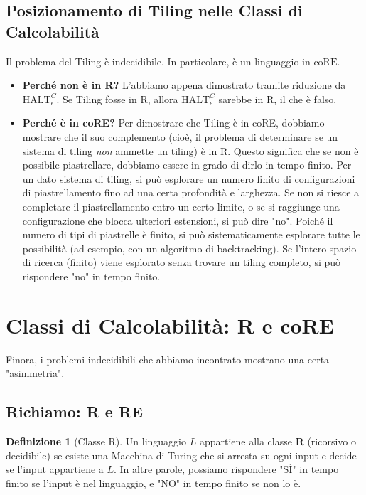 \documentclass[a4paper]{article}
\theoremstyle{definition} %
\newtheorem{definition}{Definizione}
\begin{document}
\subsection{Posizionamento di Tiling nelle Classi di Calcolabilit\`a}
Il problema del Tiling è indecidibile. In particolare, è un linguaggio in $\text{coRE}$.
\begin{itemize}
    \item \textbf{Perché non è in R?} L'abbiamo appena dimostrato tramite riduzione da $\text{HALT}_\epsilon^C$. Se Tiling fosse in R, allora $\text{HALT}_\epsilon^C$ sarebbe in R, il che è falso.
    \item \textbf{Perché è in coRE?} Per dimostrare che Tiling è in coRE, dobbiamo mostrare che il suo complemento (cioè, il problema di determinare se un sistema di tiling \emph{non} ammette un tiling) è in R. Questo significa che se non è possibile piastrellare, dobbiamo essere in grado di dirlo in tempo finito.
    Per un dato sistema di tiling, si può esplorare un numero finito di configurazioni di piastrellamento fino ad una certa profondità e larghezza. Se non si riesce a completare il piastrellamento entro un certo limite, o se si raggiunge una configurazione che blocca ulteriori estensioni, si può dire "no". Poiché il numero di tipi di piastrelle è finito, si può sistematicamente esplorare tutte le possibilità (ad esempio, con un algoritmo di backtracking). Se l'intero spazio di ricerca (finito) viene esplorato senza trovare un tiling completo, si può rispondere "no" in tempo finito.
\end{itemize}

\section{Classi di Calcolabilit\`a: R e coRE}
Finora, i problemi indecidibili che abbiamo incontrato mostrano una certa "asimmetria".

\subsection{Richiamo: R e RE}
\begin{definition}[Classe R]
Un linguaggio $L$ appartiene alla classe \textbf{R} (ricorsivo o decidibile) se esiste una Macchina di Turing che si arresta su ogni input e decide se l'input appartiene a $L$. In altre parole, possiamo rispondere "SÌ" in tempo finito se l'input è nel linguaggio, e "NO" in tempo finito se non lo è.
\end{definition}
\end{document}
